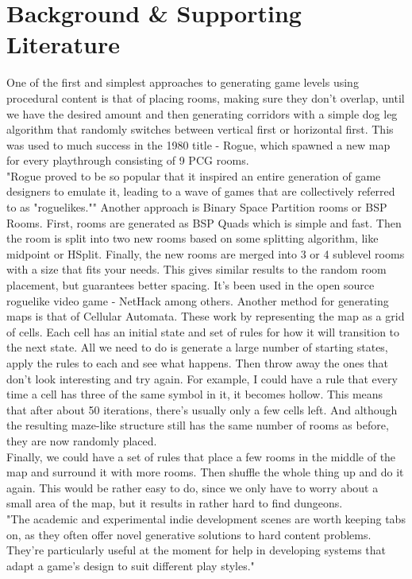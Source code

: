 \documentclass[lettersize,journal]{IEEEtran}
\begin{document}
\section{Background \& Supporting Literature}
    One of the first and simplest approaches to generating game levels using procedural content is that of placing rooms, making sure they don't overlap,
until we have the desired amount and then generating corridors with a simple dog leg algorithm that randomly switches between vertical first or horizontal first. This was used to much success in the 1980 title - Rogue, which spawned a new map for every playthrough consisting of 9 PCG rooms.\cite{rogue}\\
"Rogue proved to be so popular that it inspired an entire generation of game designers to emulate it, leading to a wave of games that are collectively referred to as "roguelikes."" \cite {gameSpy}
Another approach is Binary Space Partition rooms or BSP Rooms. First, rooms are generated as BSP Quads which is simple and fast. Then the room is split into two new rooms based on some splitting algorithm, like midpoint or HSplit. Finally, the new rooms are merged into 3 or 4 sublevel rooms with a size that fits your needs. This gives similar results to the random room placement, but guarantees better spacing. It's been used in the open source roguelike video game - NetHack among others.\cite {shaker2016procedural} \cite {roberts2014learning}\cite {short2017procedural}
Another method for generating maps is that of Cellular Automata. These work by representing the map as a grid of cells. Each cell has an initial state and set of rules for how it will transition to the next state.
All we need to do is generate a large number of starting states, apply the rules to each and see what happens. Then throw away the ones that don't look interesting and try again.
For example, I could have a rule that every time a cell has three of the same symbol in it, it becomes hollow. This means that after about 50 iterations, there's usually only a few cells left. And although the resulting maze-like structure still has the same number of rooms as before, they are now randomly placed.\\
Finally, we could have a set of rules that place a few rooms in the middle of the map and surround it with more rooms. Then shuffle the whole thing up and do it again. This would be rather easy to do, since we only have to worry about a small area of the map, but it results in rather hard to find dungeons.\cite {roberts2014learning}\cite {shaker2016procedural}
\\"The academic and experimental indie development scenes are worth keeping tabs on, as they often offer novel generative solutions to hard content problems. They're particularly useful at the moment for help in developing systems that adapt a game's design to suit different play styles."\cite {gamDev}
\end{document}
